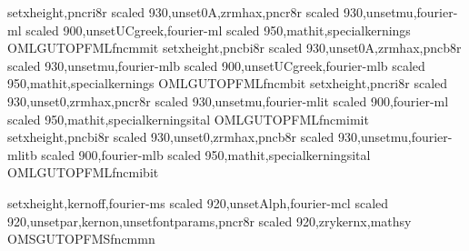 


\installfonts
{}

{setxheight,pncri8r scaled 930,unset0A,zrmhax,pncr8r scaled 930,unsetmu,fourier-ml scaled 900,unsetUCgreek,fourier-ml scaled 950,mathit,specialkernings}
{OMLGUTOP}{FML}{fncm}{m}{it}{}
{setxheight,pncbi8r scaled 930,unset0A,zrmhax,pncb8r scaled 930,unsetmu,fourier-mlb scaled 900,unsetUCgreek,fourier-mlb scaled 950,mathit,specialkernings}
{OMLGUTOP}{FML}{fncm}{b}{it}{}
{setxheight,pncri8r scaled 930,unset0,zrmhax,pncr8r scaled 930,unsetmu,fourier-mlit scaled 900,fourier-ml scaled 950,mathit,specialkerningsital}
{OMLGUTOP}{FML}{fncmi}{m}{it}{}
{setxheight,pncbi8r scaled 930,unset0,zrmhax,pncb8r scaled 930,unsetmu,fourier-mlitb scaled 900,fourier-mlb scaled 950,mathit,specialkerningsital}
{OMLGUTOP}{FML}{fncmi}{b}{it}{}

{setxheight,kernoff,fourier-ms scaled 920,unsetAlph,fourier-mcl scaled 920,unsetpar,kernon,unsetfontparams,pncr8r scaled 920,zrykernx,mathsy}
      {OMSGUTOP}{FMS}{fncm}{m}{n}{}


\endinstallfonts
%
\bye
